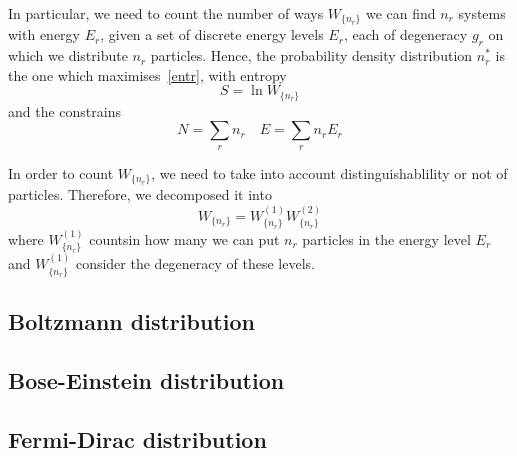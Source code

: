     In particular, we need to count the number of ways $W_{\{n_r\}}$ we can find $n_r$ systems with energy $E_r$, given a set of discrete energy levels $E_r$, each of degeneracy $g_r$ on which we distribute $n_r$ particles. Hence, the probability density distribution $n_r^*$ is the one which maximises~\eqref{entr}, with entropy 
    \begin{equation*}
        S = \ln W_{\{n_r\}}
    \end{equation*} 
    and the constrains 
    \begin{equation*}
        N = \sum_{r} n_r \quad E = \sum_r n_r E_r
    \end{equation*}

    In order to count $W_{\{n_r\}}$, we need to take into account distinguishablility or not of particles. Therefore, we decomposed it into 
    \begin{equation*}
        W_{\{n_r\}} = W_{\{n_r\}}^{(1)} W_{\{n_r\}}^{(2)}
    \end{equation*}
    where $W_{\{n_r\}}^{(1)}$ countsin how many we can put $n_r$ particles in the energy level $E_r$ and $W_{\{n_r\}}^{(1)}$ consider the degeneracy of these levels.

\subsection{Boltzmann distribution}
\subsection{Bose-Einstein distribution}
\subsection{Fermi-Dirac distribution}
